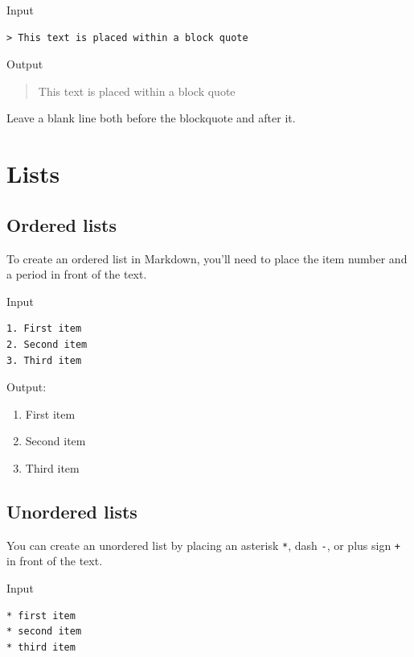 \documentclass[
]{book}
\providecommand{\tightlist}{%
  \setlength{\itemsep}{0pt}\setlength{\parskip}{0pt}}
\begin{document}
Input

\begin{verbatim}
> This text is placed within a block quote
\end{verbatim}

Output

\begin{quote}
This text is placed within a block quote
\end{quote}

Leave a blank line both before the blockquote and after it.

\hypertarget{lists}{%
\section{Lists}\label{lists}}

\hypertarget{ordered-lists}{%
\subsection*{Ordered lists}\label{ordered-lists}}

To create an ordered list in Markdown, you'll need to place the item number and a period in front of the text.

Input

\begin{verbatim}
1. First item
2. Second item
3. Third item 
\end{verbatim}

Output:

\begin{enumerate}
\def\labelenumi{\arabic{enumi}.}
\tightlist
\item
  First item
\item
  Second item
\item
  Third item
\end{enumerate}

\hypertarget{unordered-lists}{%
\subsection*{Unordered lists}\label{unordered-lists}}

You can create an unordered list by placing an asterisk \texttt{*}, dash \texttt{-}, or plus sign \texttt{+} in front of the text.

Input

\begin{verbatim}
* first item
* second item
* third item 
\end{verbatim}
\end{document}
